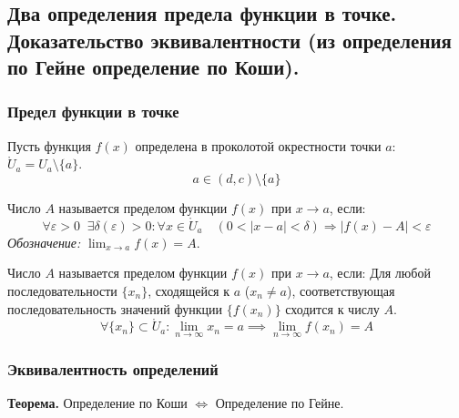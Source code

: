 \subsection{Два определения предела функции в точке. Доказательство эквивалентности (из определения по Гейне определение по Коши).}

\subsubsection*{Предел функции в точке}

Пусть функция $f(x)$ определена в проколотой окрестности точки $a$: $\mathring U_a = U_a \setminus \{a\}$.
\[ a \in (d, c) \setminus \{a\} \]

\begin{tcolorbox}[title=Определение 1 (по Коши / на языке $\varepsilon - \delta$)]
	Число $A$ называется пределом функции $f(x)$ при $x \to a$, если:
	\[ \forall \varepsilon > 0\;\; \exists \delta(\varepsilon) > 0: \forall x \in \mathring U_a \quad (0 < |x-a| < \delta) \Rightarrow |f(x) - A| < \varepsilon \]
	\textit{Обозначение:} $\lim_{x \to a} f(x) = A$.
\end{tcolorbox}

\begin{tcolorbox}[title=Определение 2 (по Гейне / на языке последовательностей)]
	Число $A$ называется пределом функции $f(x)$ при $x \to a$, если:
	Для любой последовательности $\{x_n\}$, сходящейся к $a$ ($x_n \neq a$), соответствующая последовательность значений функции $\{f(x_n)\}$ сходится к числу $A$.
	\[ \forall \{x_n\} \subset \mathring U_a: \lim_{n\to\infty} x_n = a \implies \lim_{n\to\infty} f(x_n) = A \]
\end{tcolorbox}

\subsubsection*{Эквивалентность определений}
\begin{tcolorbox}
	\textbf{Теорема.} Определение по Коши $\Leftrightarrow$ Определение по Гейне.
\end{tcolorbox}

